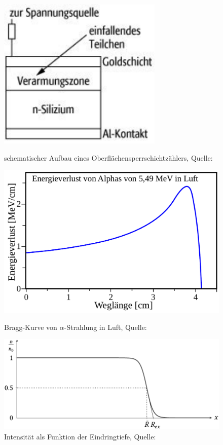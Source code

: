 \documentclass[12pt,a4paper]{scrartcl}
\numberwithin{equation}{section} %
\renewcommand{\[}{} %
\renewcommand{\]}{\noindent} %
\begin{document}
\begin{figure}[h!]
	\begin{minipage}{0.45\textwidth}
		\centering
		\includegraphics[width=0.7\textwidth]{../media/B3.3/Oberflaechensperrschichtzaehler.pdf}
		\caption{schematischer Aufbau eines Oberflächensperrschichtzählers,
			Quelle: \cite{Spektrum]}}
		\label{abb:Oberflächensperrschichtzähler}
		\vspace{1cm}
		
		\includegraphics[width=\textwidth]{../media/B3.3/Bragg-Kurve.pdf}
		\caption{Bragg-Kurve von \(\alpha\)-Strahlung in Luft, Quelle: \cite{Alpha Luft}}
		\label{abb:Bragg-Kurve}
	\end{minipage}
	\vspace{1cm}
	
	\begin{minipage}{0.8\textwidth}
		\includegraphics[width=\textwidth]{../media/B3.3/Reichweite.pdf}
		\caption{Intensität als Funktion der Eindringtiefe, Quelle: \cite{Uni}}
		\label{abb:Reichweite}
	\end{minipage}
\end{figure}
\end{document}
